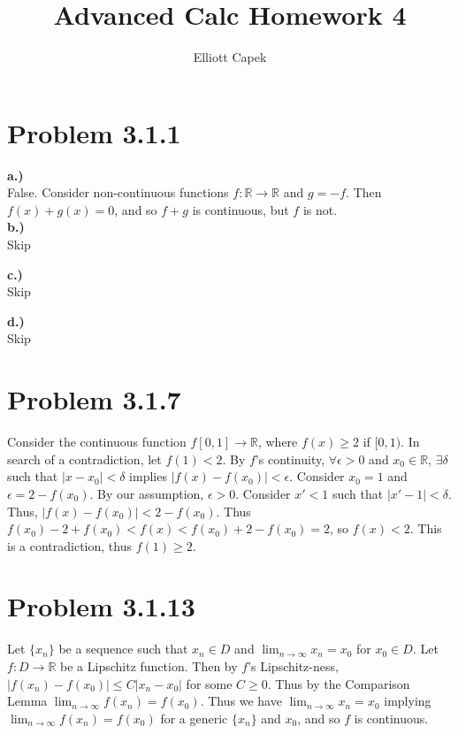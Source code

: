 \documentclass[10pt]{article} %
\title{Advanced Calc Homework 4}
\author{Elliott Capek}
\begin{document}
\maketitle{}

\section{Problem 3.1.1}
\textbf{a.)}\\
False. Consider non-continuous functions $f: \mathbb{R} \rightarrow \mathbb{R}$ and $g = -f$. Then $f(x) + g(x) = 0$, and so $f+g$ is continuous, but $f$ is not.\\

\textbf{b.)}\\
Skip

\textbf{c.)}\\
Skip

\textbf{d.)}\\
Skip

\section{Problem 3.1.7}
Consider the continuous function $f[0,1] \rightarrow \mathbb{R}$, where $f(x) \geq 2$ if $[0,1)$. In search of a contradiction, let $f(1) < 2$. By $f$'s continuity, $\forall \epsilon > 0$ and $x_0 \in \mathbb{R}$, $\exists \delta$ such that $|x - x_0| < \delta$ implies $|f(x) - f(x_0)| < \epsilon$. Consider $x_0 = 1$ and $\epsilon = 2 - f(x_0)$. By our assumption, $\epsilon > 0$. Consider $x' < 1$ such that $|x' - 1| < \delta$. Thus, $|f(x) - f(x_0)| < 2 - f(x_0)$. Thus $f(x_0) - 2 + f(x_0) < f(x) < f(x_0) + 2 - f(x_0) = 2$, so $f(x) < 2$. This is a contradiction, thus $f(1) \geq 2$.\\

\section{Problem 3.1.13}
Let $\{x_n\}$ be a sequence such that $x_n \in D$ and $\lim_{n\rightarrow\infty} x_n = x_0$ for $x_0 \in D$. Let $f: D \rightarrow \mathbb{R}$ be a Lipschitz function. Then by $f$'s Lipschitz-ness, $|f(x_n) - f(x_0)| \leq C|x_n - x_0|$ for some $C \geq 0$. Thus by the Comparison Lemma $\lim_{n\rightarrow\infty} f(x_n) = f(x_0)$. Thus we have $\lim_{n\rightarrow\infty} x_n = x_0$ implying $\lim_{n\rightarrow\infty} f(x_n) = f(x_0)$ for a generic $\{x_n\}$ and $x_0$, and so $f$ is continuous.\\
\end{document}
